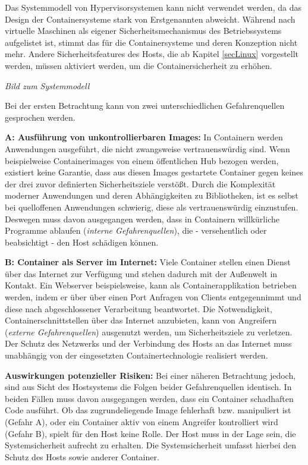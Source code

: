 \documentclass[../main.tex]{subfiles}
\begin{document}
  Das Systemmodell von Hypervisorsystemen kann nicht verwendet werden, da das Design der Containersysteme stark von Erstgenannten abweicht. Während nach \cite[S.125]{CISSP} virtuelle Maschinen als eigener Sicherheitsmechanismus des Betriebssystems aufgelistet ist, stimmt das für die Containersysteme und deren Konzeption nicht mehr. Andere Sicherheitsfeatures des Hosts, die ab Kapitel \ref{secLinux} vorgestellt werden, müssen aktiviert werden, um die Containersicherheit zu erhöhen.

  \emph{Bild zum Systemmodell}

  Bei der ersten Betrachtung kann von zwei unterschiedlichen Gefahrenquellen gesprochen werden.

  \textbf{A: Ausführung von unkontrollierbaren Images:} In Containern werden Anwendungen ausgeführt, die nicht zwangsweise vertrauenswürdig sind. Wenn beispielweise Containerimages von einem öffentlichen Hub bezogen werden, existiert keine Garantie, dass aus diesen Images gestartete Container gegen keines der drei zuvor definierten Sicherheitsziele verstößt. Durch die Komplexität moderner Anwendungen und deren Abhängigkeiten zu Bibliotheken, ist es selbst bei quelloffenen Anwendungen schwierig, diese als vertrauenswürdig einzustufen. Deswegen muss davon ausgegangen werden, dass in Containern willkürliche Programme ablaufen (\emph{interne Gefahrenquellen}), die - versehentlich oder beabsichtigt - den Host schädigen können.

  \textbf{B: Container als Server im Internet:} Viele Container stellen einen Dienst über das Internet zur Verfügung und stehen dadurch mit der Außenwelt in Kontakt. Ein Webserver beispielsweise, kann als Containerapplikation betrieben werden, indem er über über einen Port Anfragen von Clients entgegennimmt und diese nach abgeschlossener Verarbeitung beantwortet. Die Notwendigkeit, Containerschnittstellen über das Internet anzubieten, kann von Angreifern (\emph{externe Gefahrenquellen}) ausgenutzt werden, um Sicherheitsziele zu verletzen. Der Schutz des Netzwerks und der Verbindung des Hosts an das Internet muss unabhängig von der eingesetzten Containertechnologie realisiert werden.


  \textbf{Auswirkungen potenzieller Risiken:}
  Bei einer näheren Betrachtung jedoch, sind aus Sicht des Hostsystems die Folgen beider Gefahrenquellen identisch. In beiden Fällen muss davon ausgegangen werden, dass ein Container schadhaften Code ausführt. Ob das zugrundeliegende Image fehlerhaft bzw. manipuliert ist (Gefahr A), oder ein Container aktiv von einem Angreifer kontrolliert wird (Gefahr B), spielt für den Host keine Rolle. Der Host muss in der Lage sein, die Systemsicherheit aufrecht zu erhalten. Die Systemsicherheit umfasst hierbei den Schutz des Hosts sowie anderer Container.
\end{document}
